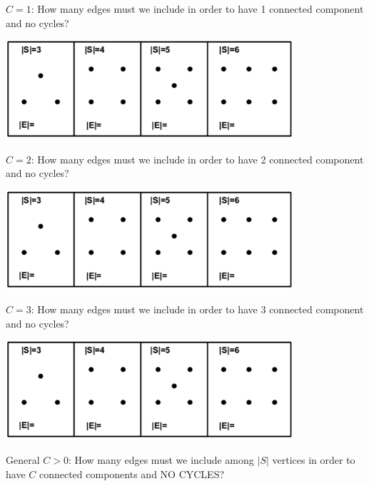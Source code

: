 \documentclass[11pt]{article}
\theoremstyle{definition}
\newcommand{\answerbox}[3]{%
  \fbox{%
    \begin{minipage}[#1]{#2}
      \hfill\vspace{#3}
    \end{minipage}
  }
}
\newcommand{\answerboxfull}[2]{%
  \answerbox{#1}{6.38in}{#2} 
}
\begin{document}
\begin{description}
\item{$C = 1$:}  How many edges must we include in order to have 1 connected component and no cycles?

\includegraphics[width = 0.8\textwidth]{four_graphs.png}

\vfill
\item{$C = 2$:}  How many edges must we include in order to have 2 connected component and no cycles?

\includegraphics[width = 0.8\textwidth]{four_graphs.png}

\vfill

\item{$C = 3$:}  How many edges must we include in order to have 3 connected component and no cycles?

\includegraphics[width = 0.8\textwidth]{four_graphs.png}

\vfill
\item{General $C> 0$:} How many edges must we include among $|S|$ vertices in order to have $C$ connected components and NO CYCLES?

\answerboxfull{c}{2cm}

\vfill
\end{description}
\end{document}
